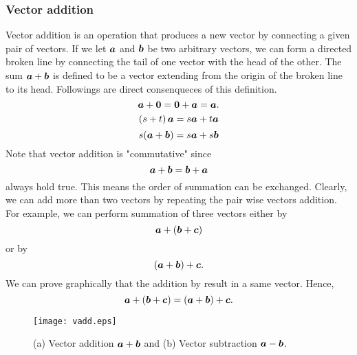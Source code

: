 \documentclass[10pt,a4j]{article}
\begin{document}
\subsubsection{Vector addition}
Vector addition is an operation that produces a new vector 
by connecting a given  pair of vectors. 
If we let $\mbox{\boldmath $a$}$ and $\mbox{\boldmath $b$}$ be two arbitrary vectors, 
we can form a directed broken line by connecting the tail of one vector with 
the head of the other. The sum $\mbox{\boldmath $a$}+\mbox{\boldmath $b$}$ is defined to be a vector 
extending from the origin of the broken line to its head.
Followings are direct consenqueces of this definition.
\begin{equation}
	\mbox{\boldmath $a$}+\mbox{\boldmath $0$} = \mbox{\boldmath $0$}+\mbox{\boldmath $a$}=\mbox{\boldmath $a$}. 
	\label{eqn:add_zero_vec}
\end{equation}
\begin{equation}
	\left(s+t \right)\mbox{\boldmath $a$}= s\mbox{\boldmath $a$}+ t\mbox{\boldmath $a$}
	\label{eqn:dist_scalar}
\end{equation}
\begin{equation}
	s(\mbox{\boldmath $a$}+\mbox{\boldmath $b$})=s\mbox{\boldmath $a$}+s\mbox{\boldmath $b$}
	\label{eqn:dist_vec}
\end{equation}
Note that vector addition is "commutative" since 
\begin{equation}
	\mbox{\boldmath $a$}+\mbox{\boldmath $b$}=\mbox{\boldmath $b$}+\mbox{\boldmath $a$}
	\label{eqn:cmmt_vec_add}
\end{equation}
always hold true. This means the order of summation can be exchanged. 
Clearly, we can add more than two vectors by repeating the pair wise vectors addition.
For example, we can perform summation of three vectors either by 
\[
	\mbox{\boldmath $a$}+\left( \mbox{\boldmath $b$}+\mbox{\boldmath $c$} \right)
\]
or by 
\[
	\left( \mbox{\boldmath $a$}+\mbox{\boldmath $b$} \right) + \mbox{\boldmath $c$}.
\]
We can prove graphically that the addition by result in a same vector. Hence, 
\begin{equation}
	\mbox{\boldmath $a$}+\left( \mbox{\boldmath $b$}+\mbox{\boldmath $c$} \right)
	=
	\left( \mbox{\boldmath $a$}+\mbox{\boldmath $b$} \right) + \mbox{\boldmath $c$}.
	\label{eqn:assct_vadd}
\end{equation}
\begin{figure}[h]
	\begin{center}
	\texttt{[image: vadd.eps]} 
	\end{center}
	\caption{(a) Vector addition $\mbox{\boldmath $a$}+\mbox{\boldmath $b$}$ and 
	(b) Vector subtraction $\mbox{\boldmath $a$}-\mbox{\boldmath $b$}$.} 
	\label{fig:1_4}
\end{figure}
\end{document}
